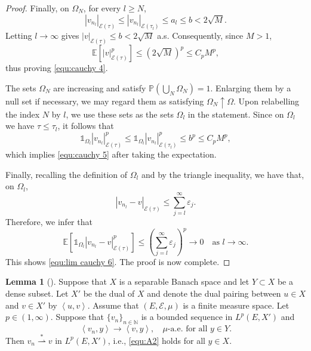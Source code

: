 \documentclass[11pt, reqno]{amsart}
\theoremstyle{definition}
\newtheorem{lemma}[theorem]{Lemma}
\numberwithin{equation}{section}
\newcommand{\bb}{\mathbb}
\newcommand{\inpro}[2]{\left\langle#1,#2\right\rangle}
\newcommand{\abs}[1]{\left|{#1}\right|}
\newcommand{\one}{\mathds{1}}
\begin{document}
\begin{proof}
	Finally, on $\Omega_N$, for every $l\geq N$,
	\[
	\abs{v_{n_l}}_{\mathcal E(\tau)}
	\leq
	\abs{v_{n_l}}_{\mathcal E(\tau_l)}
	\leq
	a_l
	\leq b
	<
	2\sqrt M .
	\]
	Letting $l\to\infty$ gives $\abs{v}_{\mathcal E(\tau)}
	\leq b < 2\sqrt M$ a.s.
	Consequently, since $M>1$,
	\[
	\mathbb E\left[
	\abs{v}_{\mathcal E(\tau)}^p
	\right]
	\leq
	(2\sqrt M)^p
	\leq
	C_p M^p,
	\]
	thus proving \eqref{equ:cauchy 4}.
	
	The sets $\Omega_N$ are increasing and satisfy
	$\mathbb P(\bigcup_N\Omega_N)=1$. Enlarging them by a null set if necessary,
	we may regard them as satisfying $\Omega_N\uparrow\Omega$. Upon relabelling the index $N$ by $l$, we use these sets as the sets $\Omega_l$ in the statement. Since on $\Omega_l$ we
	have $\tau\leq\tau_l$, it follows that
	\[
	\one_{\Omega_l}\abs{v_{n_l}}_{\mathcal E(\tau)}^p
	\leq
	\one_{\Omega_l}\abs{v_{n_l}}_{\mathcal E(\tau_l)}^p
	\leq
	b^p
	\leq
	C_p M^p,
	\]
	which implies \eqref{equ:cauchy 5} after taking the expectation.

	Finally, recalling the definition of $\Omega_l$ and by the triangle inequality, we have that, on $\Omega_l$,
	\[
	\abs{v_{n_l}-v}_{\mathcal E(\tau)}
	\leq
	\sum_{j=l}^{\infty}\varepsilon_j .
	\]
	Therefore, we infer that
	\[
	\mathbb E\left[
	\one_{\Omega_l}
	\abs{v_{n_l}-v}_{\mathcal E(\tau)}^p
	\right]
	\leq
	\left(
	\sum_{j=l}^{\infty}\varepsilon_j
	\right)^p
	\longrightarrow 0 \quad \text{as $l\to\infty$.}
	\]
	This shows \eqref{equ:lim cauchy 6}. The proof is now complete.
\end{proof}



\begin{lemma}[\cite{GlaZia09}]  \label{lem:weak conv}
Suppose that $X$ is a separable Banach space and let $Y\subset X$ be a dense subset. Let $X'$ be the dual of $X$ and denote the dual pairing between $u\in X$ and $v\in X'$ by $\inpro{u}{v}$. Assume that $(E,\mathcal{E},\mu)$ is a finite measure space. Let $p\in (1,\infty)$. Suppose that $\{v_n\}_{n\in\bb{N}}$ is a bounded sequence in $L^p(E,X')$ and 
\begin{equation}\label{equ:A2}
	\inpro{v_n}{y} \to \inpro{v}{y}, \; \text{ $\mu$-a.e. for all $y\in Y$.}
\end{equation}
Then $v_n \overset{\ast}{\rightharpoonup} v$ in $L^p(E,X')$, i.e., \eqref{equ:A2} holds for all $y\in X.$
\end{lemma}
\end{document}
